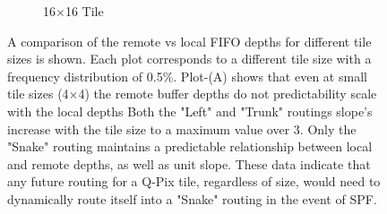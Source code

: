\begin{figure}
\begin{subfigure}[b]{0.475\textwidth}
      \caption[]%
      {\small 16$\times$16 Tile}    
  \end{subfigure}
  \caption[]
  {\small A comparison of the remote vs local FIFO depths for different tile sizes is shown.
  Each plot corresponds to a different tile size with a frequency distribution of 0.5\%.
  Plot-(A) shows that even at small tile sizes (4$\times$4) the remote buffer depths do not predictability scale with the local depths
  Both the "Left" and "Trunk" routings slope's increase with the tile size to a maximum value over 3.
  Only the "Snake" routing maintains a predictable relationship between local and remote depths, as well as unit slope.
  These data indicate that any future routing for a Q-Pix tile, regardless of size, would need to dynamically route itself into a "Snake" routing in the event of SPF.
  } 
  \label{fig:compare_slow_plots_for_digital_sim_slow}
\end{figure}

